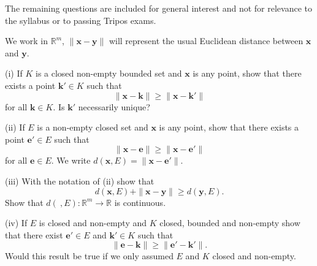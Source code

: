 \vspace{1\baselineskip}

The remaining questions are included for general interest
and not for relevance to the syllabus or to passing Tripos exams.

\begin{question}\label{4.12}
We work in ${\mathbb R}^{m}$, 
$\|{\mathbf x}-{\mathbf y}\|$ will represent the
usual Euclidean distance between ${\mathbf x}$ and
${\mathbf y}$.

(i) If $K$ is a closed non-empty bounded set and ${\mathbf x}$
is any point, show that there exists a point
${\mathbf k}'\in K$ such that  
\[\|{\mathbf x}-{\mathbf k}\|\geq \|{\mathbf x}-{\mathbf k}'\|\]
for all ${\mathbf k}\in K$.  Is ${\mathbf k}'$ 
necessarily unique?

(ii) If $E$ is a non-empty closed set and ${\mathbf x}$
is any point, show that there exists a point
${\mathbf e}'\in E$ such that  
\[\|{\mathbf x}-{\mathbf e}\|\geq \|{\mathbf x}-{\mathbf e}'\|\]
for all ${\mathbf e}\in E$. 
We write $d({\mathbf x},E)=\|{\mathbf x}-{\mathbf e}'\|.$

(iii) With the notation of (ii) show that
\[d({\mathbf x},E)+\|{\mathbf x}-{\mathbf y}\|
\geq d({\mathbf y},E).\]
Show that $d(\ ,E):{\mathbb R}^{m}\rightarrow{\mathbb R}$
is continuous.

(iv) If $E$ is closed and non-empty and $K$ closed,
bounded
and non-empty show that
there exist ${\mathbf e}'\in E$ and ${\mathbf k}'\in K$
such that
\[\|{\mathbf e}-{\mathbf k}\|\geq \|{\mathbf e}'-{\mathbf k}'\|.\]
Would this result be true if we only assumed $E$ and $K$
closed and non-empty. 

\end{question}

